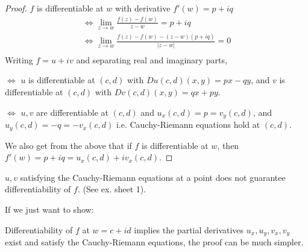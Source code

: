 \begin{proof}
    \(f\) is differentiable at \(w\) with derivative \(f'(w) = p + iq\)
    \begin{gather*}
        \iff \lim_{z \to w} \frac{f(z) - f(w)}{z - w} = p + iq\\
        \iff \lim_{z \to w} \frac{f(z) - f(w) - (z - w)(p + iq)}{\left\vert z-w \right\vert} = 0\\
    \end{gather*}
    Writing \(f = u + iv\) and separating real and imaginary parts,


    \(\iff \) \(u\) is differentiable at \((c,d)\) with \(Du(c,d)(x,y) = px - qy\), and \(v\) is differentiable at \((c,d)\) with \(Dv(c,d)(x,y) = qx + py\).

    \(\iff \) \(u,v\) are differentiable at \((c,d)\) and \(u_x (c,d) = p = v_y(c,d)\), and \(u_y(c,d) = -q = -v_x(c,d)\) i.e. Cauchy-Riemann equations hold at \((c,d)\).

    We also get from the above that if \(f\) is differentiable at \(w\), then \(f'(w) = p + iq = u_x(c,d) + iv_x(c,d)\).
\end{proof}
\begin{remark}
    \(u, v\) satisfying the Cauchy-Riemann equations at a point does not guarantee differentiability of \(f\). (See ex. sheet 1).
\end{remark}

\begin{remark}
    If we just want to show:

    Differentiability of \(f\) at \(w = c + id\) implies the partial derivatives \(u_x, u_y, v_x, v_y\) exist and satisfy the Cauchy-Riemann equations, the proof can be much simpler.
\end{remark}
